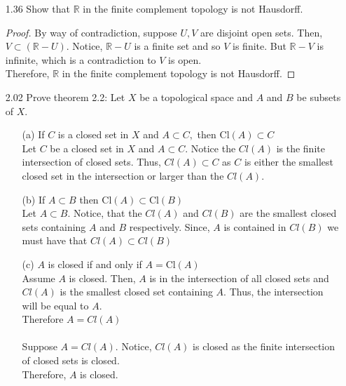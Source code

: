 \documentclass[12pt]{article}
\newcommand{\R}{\mathbb{R}}
\begin{document}
\begin{enumerate}
		\item[1.36]  Show that $\mathbb { R }$ in the finite complement topology is not Hausdorff.\\
		\begin{proof}
				By way of contradiction, suppose $ U,V $ are disjoint open sets. Then, $ V \subset (\R-U) $. Notice, $ \R -U $ is a finite set and so $ V $ is finite. But $ \R-V $ is infinite, which is a contradiction to $ V $ is open.\\
				Therefore, $\mathbb { R }$ in the finite complement topology is not Hausdorff.
				\end{proof}
		\item[2.02] Prove theorem 2.2: Let $ X $ be a topological space and $ A $ and $ B $ be subsets of $ X $.
		\begin{enumerate}
			\item[(a)]If $C$ is a closed set in $X$ and $A \subset C ,$ then $\mathrm { Cl } ( A ) \subset C$\\
			Let $ C $ be a closed set in $ X $ and $ A\subset C $. Notice the $ Cl(A) $ is the finite intersection of closed sets. Thus, $ Cl(A) \subset C$ as $ C $ is either the smallest closed set in the intersection or larger than the $ Cl(A) $. 
			\item[(b)] If $A \subset B$ then $\mathrm { Cl } ( A ) \subset \mathrm { Cl } ( B )$\\
			Let $ A \subset B $. Notice, that the $ Cl(A) $ and $ Cl(B) $ are the smallest closed sets containing $ A $ and $ B $ respectively. Since, $ A $ is contained in $ Cl(B) $ we must have that $ Cl(A)\subset Cl(B)$
			\item[(c)] $A$ is closed if and only if $A = \mathrm { Cl } ( A )$\\
			Assume $ A $ is closed. Then, $ A $ is in the intersection of all closed sets and $ Cl(A) $ is the smallest closed set containing $ A $. Thus, the intersection will be equal to $ A $. \\
			Therefore $ A=Cl(A) $ \\
			\\
			Suppose $ A=Cl(A) $. Notice, $ Cl(A) $ is closed as the finite intersection of closed sets is closed. \\
			Therefore, $ A $ is closed.
		\end{enumerate}
		

\end{enumerate}
\end{document}
